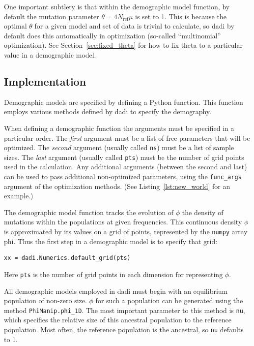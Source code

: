 \documentclass[12pt]{article}
\makeatletter
\newcommand{\dadi}{dadi\xspace}
\newcommand{\Nref}{\ensuremath{N_\text{ref}}\xspace}
\newcommand{\py}[1]{\lstinline[language=Python, showstringspaces=False]@#1@}
\makeatother
\begin{document}
One important subtlety is that within the demographic model function, by default the mutation parameter $\theta = 4 \Nref \mu$ is set to 1.
This is because the optimal $\theta$ for a given model and set of data is trivial to calculate, so \dadi by default does this automatically in optimization (so-called ``multinomial'' optimization).
See Section~\ref{sec:fixed_theta} for how to fix theta to a particular value in a demographic model.

\subsection{Implementation}

Demographic models are specified by defining a Python function.
This function employs various methods defined by \dadi to specify the demography.

When defining a demographic function the arguments must be specified in a particular order.
The \emph{first} argument must be a list of free parameters that will be optimized.
The \emph{second} argument (usually called \py{ns}) must be a list of sample sizes.
The \emph{last} argument (usually called \py{pts}) must be the number of grid points used in the calculation.
Any additional arguments (between the second and last) can be used to pass additional non-optimized parameters, using the \py{func_args} argument of the optimization methods.
(See Listing~\ref{lst:new_world} for an example.)

The demographic model function tracks the evolution of $\phi$ the density of mutations within the populations at given frequencies.
This continuous density $\phi$ is approximated by its values on a grid of points, represented by the \py{numpy} array {phi}.
Thus the first step in a demographic model is to specify that grid:
\begin{lstlisting}
xx = dadi.Numerics.default_grid(pts)
\end{lstlisting}
Here \py{pts} is the number of grid points in each dimension for representing $\phi$.

All demographic models employed in \dadi must begin with an equilibrium population of non-zero size.
$\phi$ for such a population can be generated using the method \py{PhiManip.phi_1D}.
The most important parameter to this method is \py{nu}, which specifies the relative size of this ancestral population to the reference population.
Most often, the reference population is the ancestral, so \py{nu} defaults to 1.
\end{document}
